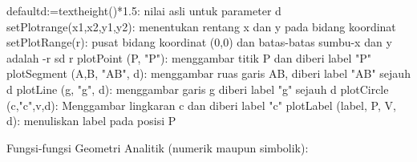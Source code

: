 \documentclass[a4paper,10pt]{article}
\begin{document}
\begin{eulernotebook}
\begin{eulercomment}
\begin{eulercomment}
\begin{eulercomment}
\begin{eulercomment}
\begin{eulercomment}
\begin{eulercomment}
\begin{eulercomment}
\begin{eulercomment}
\begin{eulercomment}
\begin{eulercomment}
\begin{eulercomment}
\begin{eulercomment}
\begin{eulercomment}
\begin{eulercomment}
\begin{eulercomment}
\begin{eulercomment}
\begin{eulercomment}
\begin{eulercomment}
\begin{eulercomment}
\end{eulercomment}
\begin{eulerttcomment}
  defaultd:=textheight()*1.5: nilai asli untuk parameter d
  setPlotrange(x1,x2,y1,y2): menentukan rentang x dan y pada bidang koordinat
  setPlotRange(r): pusat bidang koordinat (0,0) dan batas-batas sumbu-x dan y adalah -r sd r
  plotPoint (P, "P"): menggambar titik P dan diberi label "P"
  plotSegment (A,B, "AB", d): menggambar ruas garis AB, diberi label "AB" sejauh d
  plotLine (g, "g", d): menggambar garis g diberi label "g" sejauh d
  plotCircle (c,"c",v,d): Menggambar lingkaran c dan diberi label "c"
  plotLabel (label, P, V, d): menuliskan label pada posisi P
\end{eulerttcomment}
\begin{eulercomment}

Fungsi-fungsi Geometri Analitik (numerik maupun simbolik):


\end{eulercomment}
\end{eulercomment}
\end{eulercomment}
\end{eulercomment}
\end{eulercomment}
\end{eulercomment}
\end{eulercomment}
\end{eulercomment}
\end{eulercomment}
\end{eulercomment}
\end{eulercomment}
\end{eulercomment}
\end{eulercomment}
\end{eulercomment}
\end{eulercomment}
\end{eulercomment}
\end{eulercomment}
\end{eulercomment}
\end{eulercomment}
\end{eulernotebook}
\end{document}
